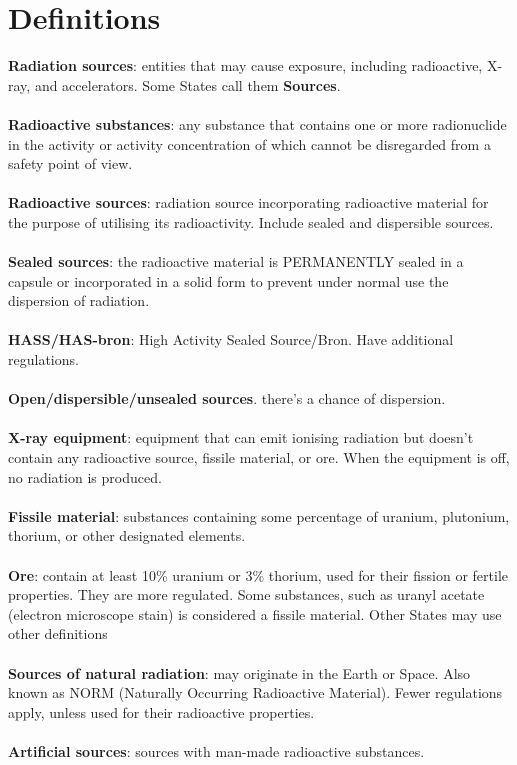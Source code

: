 \section{Definitions}
\textbf{Radiation sources}: entities that may cause exposure, including radioactive, X-ray, and accelerators. Some States call them \textbf{Sources}.\\\\
\textbf{Radioactive substances}: any substance that contains one or more radionuclide in the activity or activity concentration of which cannot be disregarded from a safety point of view.\\\\
\textbf{Radioactive sources}: radiation source incorporating radioactive material for the purpose of utilising its radioactivity. Include sealed and dispersible sources.\\\\
\textbf{Sealed sources}: the radioactive material is PERMANENTLY sealed in a capsule or incorporated in a solid form to prevent under normal use the dispersion of radiation.\\\\
\textbf{HASS/HAS-bron}: High Activity Sealed Source/Bron. Have additional regulations. \\\\
\textbf{Open/dispersible/unsealed sources}. there's a chance of dispersion.\\\\
\textbf{X-ray equipment}: equipment that can emit ionising radiation but doesn't contain any radioactive source, fissile material, or ore. When the equipment is off, no radiation is produced.\\\\
\textbf{Fissile material}: substances containing some percentage of uranium, plutonium, thorium, or other designated elements.\\\\
\textbf{Ore}: contain at least 10\% uranium or 3\% thorium, used for their fission or fertile properties. They are more regulated. Some substances, such as uranyl acetate (electron microscope stain) is considered a fissile material. Other States may use other definitions
\\\\\textbf{Sources of natural radiation}: may originate in the Earth or Space. Also known as NORM (Naturally Occurring Radioactive Material). Fewer regulations apply, unless used for their radioactive properties.
\\\\\textbf{Artificial sources}: sources with man-made radioactive substances.

